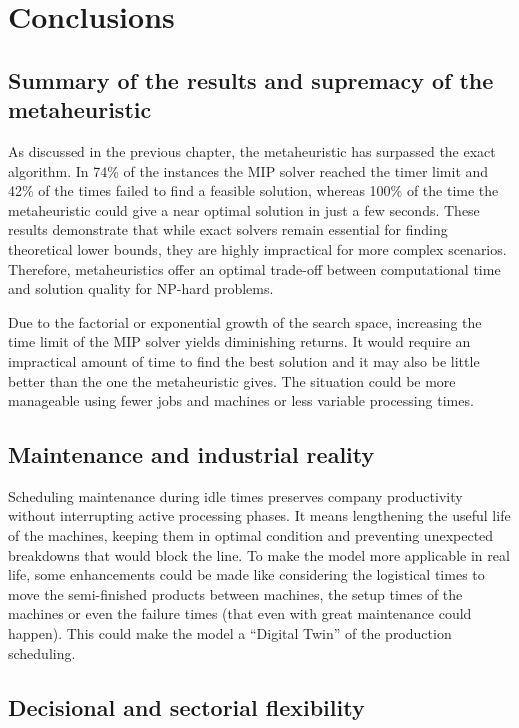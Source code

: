 \chapter{Conclusions}
\label{sec:intro_concl}

\section[Summary of the results and supremacy of the metaheuristic]{Summary of the results and supremacy of the metaheuristic}

As discussed in the previous chapter, the metaheuristic has surpassed the exact algorithm. In 74\% of the instances the MIP solver reached the timer limit and 42\% of the times failed to find a feasible solution, whereas 100\% of the time the metaheuristic could give a near optimal solution in just a few seconds. These results demonstrate that while exact solvers remain essential for finding theoretical lower bounds, they are highly impractical for more complex scenarios. Therefore, metaheuristics offer an optimal trade-off between computational time and solution quality for NP-hard problems.

Due to the factorial or exponential growth of the search space, increasing the time limit of the MIP solver yields diminishing returns. It would require an impractical amount of time to find the best solution and it may also be little better than the one the metaheuristic gives. The situation could be more manageable using fewer jobs and machines or less variable processing times. 

\section[Maintenance and industrial reality]{Maintenance and industrial reality}

Scheduling maintenance during idle times preserves company productivity without interrupting active processing phases. It means lengthening the useful life of the machines, keeping them in optimal condition and preventing unexpected breakdowns that would block the line. To make the model more applicable in real life, some enhancements could be made like considering the logistical times to move the semi-finished products between machines, the setup times of the machines or even the failure times (that even with great maintenance could happen). This could make the model a ``Digital Twin'' of the production scheduling.

\section[Decisional and sectorial flexibility]{Decisional and sectorial flexibility}


